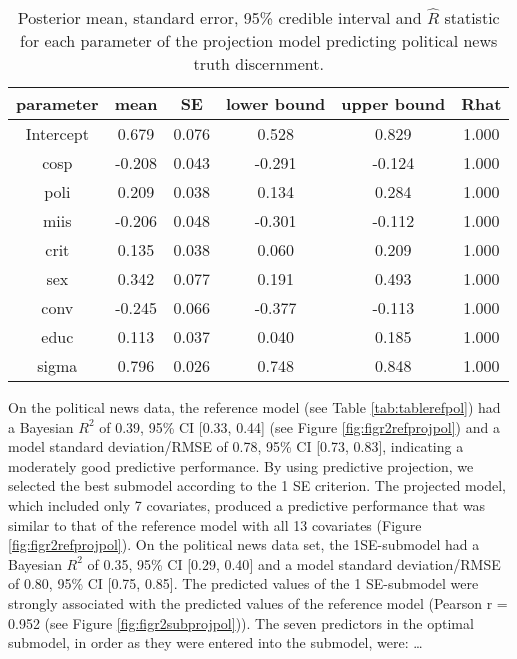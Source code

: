 \documentclass[
  english,
  man,floatsintext]{apa6}
\begin{document}
\begin{table}[H]

\begin{center}
\begin{threeparttable}

\caption{\label{tab:tablesubpol}Posterior mean, standard error, 95\% credible interval and $\hat{R}$
    statistic for each parameter of the projection model predicting political news truth discernment.}

\small{

\begin{tabular}{cccccc}
\toprule
parameter & \multicolumn{1}{c}{mean} & \multicolumn{1}{c}{SE} & \multicolumn{1}{c}{lower bound} & \multicolumn{1}{c}{upper bound} & \multicolumn{1}{c}{Rhat}\\
\midrule
Intercept & 0.679 & 0.076 & 0.528 & 0.829 & 1.000\\
cosp & -0.208 & 0.043 & -0.291 & -0.124 & 1.000\\
poli & 0.209 & 0.038 & 0.134 & 0.284 & 1.000\\
miis & -0.206 & 0.048 & -0.301 & -0.112 & 1.000\\
crit & 0.135 & 0.038 & 0.060 & 0.209 & 1.000\\
sex & 0.342 & 0.077 & 0.191 & 0.493 & 1.000\\
conv & -0.245 & 0.066 & -0.377 & -0.113 & 1.000\\
educ & 0.113 & 0.037 & 0.040 & 0.185 & 1.000\\
sigma & 0.796 & 0.026 & 0.748 & 0.848 & 1.000\\
\bottomrule
\end{tabular}

}

\end{threeparttable}
\end{center}

\end{table}

On the political news data, the reference model (see Table \ref{tab:tablerefpol}) had a Bayesian \(R^2\) of 0.39, 95\% CI {[}0.33, 0.44{]} (see Figure \ref{fig:figr2refprojpol}) and a model standard deviation/RMSE of 0.78, 95\% CI {[}0.73, 0.83{]}, indicating a moderately good predictive performance. By using predictive projection, we selected the best submodel according to the 1 SE criterion. The projected model, which included only 7 covariates, produced a predictive performance that was similar to that of the reference model with all 13 covariates (Figure \ref{fig:figr2refprojpol}). On the political news data set, the 1SE-submodel had a Bayesian \(R^2\) of 0.35, 95\% CI {[}0.29, 0.40{]} and a model standard deviation/RMSE of 0.80, 95\% CI {[}0.75, 0.85{]}. The predicted values of the 1 SE-submodel were strongly associated with the predicted values of the reference model (Pearson r = 0.952 (see Figure \ref{fig:figr2subprojpol})). The seven predictors in the optimal submodel, in order as they were entered into the submodel, were: \ldots{}
\end{document}

